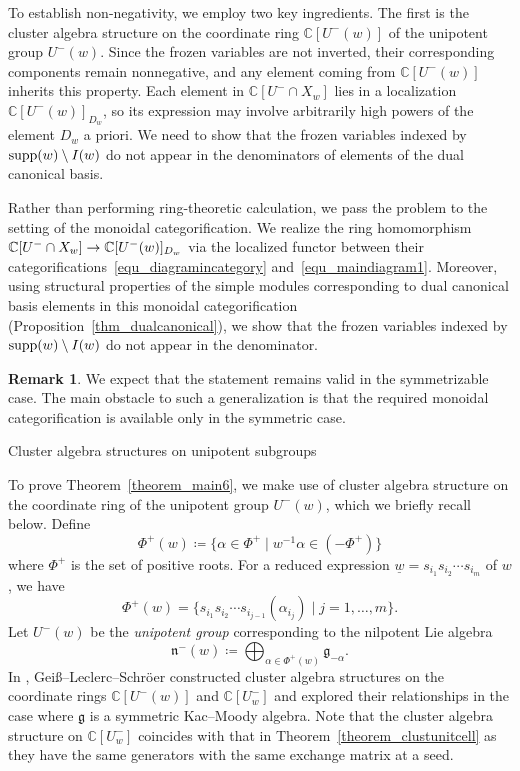 \documentclass[11pt]{amsart}
\makeatletter
\def\subsection{\@startsection{subsection}{2}%
  \z@{-.8\linespacing\@plus-.3\linespacing}{.3\linespacing\@plus.2\linespacing}%
  {\normalfont\bfseries}}
\newcommand{\C}{\mathbb{C}}
\def\frak{\mathfrak}
\numberwithin{equation}{section}
\theoremstyle{plain}
\theoremstyle{definition}
\newtheorem{remark}[theorem]{Remark}
\def\to{\mathchoice{\longrightarrow}{\rightarrow}{\rightarrow}{\rightarrow}}
\numberwithin{equation}{section}
\makeatother
\begin{document}
To establish non-negativity, we employ two key ingredients. The first is the cluster algebra structure on the coordinate ring $\C[U^-(w)]$ of the unipotent group $U^-(w)$. Since the frozen variables are not inverted, their corresponding components remain nonnegative, and any element coming from $\C[U^-(w)]$ inherits this property. Each element in $\C[U^-\cap X_w]$ lies in a localization $\C[U^-(w)]_{D_w}$, so its expression may involve arbitrarily high powers of the element $D_w$ a priori. We need to show that the frozen variables indexed by ${\rm supp}(w) \setminus I(w)$ do not appear in the denominators of elements of the dual canonical basis.

Rather than performing ring-theoretic calculation, we pass the problem to the setting of the monoidal categorification. We realize the ring homomorphism $\C[U^- \cap X_w] \to \C[U^-(w)]_{D_w}$ via the localized functor between their categorifications~\eqref{equ_diagramincategory} and~\eqref{equ_maindiagram1}. Moreover, using structural properties of the simple modules corresponding to dual canonical basis elements in this monoidal categorification (Proposition~\ref{thm_dualcanonical}), we show that the frozen variables indexed by ${\rm supp}(w) \setminus I(w)$ do not appear in the denominator. 


\begin{remark}
We expect that the statement remains valid in the symmetrizable case. The main obstacle to such a generalization is that the required monoidal categorification is available only in the symmetric case.
\end{remark}



\subsection{Cluster algebra structures on unipotent subgroups}

To prove Theorem~\ref{theorem_main6}, we make use of cluster algebra structure on the coordinate ring of the unipotent group $U^-(w)$, which we briefly recall below. Define 
$$
\Phi^+(w) \coloneqq \bigl\{ \alpha \in \Phi^+ \mid w^{-1} \alpha \in (- \Phi^+) \bigr\}
$$ 
where $\Phi^+$ is the set of positive roots. For a reduced expression $\underline{w} =  s_{i_1} s_{i_2} \cdots s_{i_m}$ of $w$, we have
$$
\Phi^+(w) = \{  s_{i_1} s_{i_2}\cdots s_{i_{j-1}}(\alpha_{i_j}) \mid j = 1, \dots, m\}.
$$
Let $U^-(w)$ be the \emph{unipotent group} corresponding to the nilpotent Lie algebra
$$
\frak{n}^-(w) \coloneqq \bigoplus_{\alpha \in \Phi^+(w)} \frak{g}_{-\alpha}.
$$
In \cite{GLS11}, Gei{\ss}--Leclerc--Schr{\"{o}}er constructed cluster algebra structures on the coordinate rings $\C[U^-(w)]$ and $\C[U^-_w]$ and explored their relationships in the case where $\frak{g}$ is a symmetric Kac--Moody algebra. Note that the cluster algebra structure on $\C[U^-_w]$ coincides with that in Theorem~\ref{theorem_clustunitcell} as they have the same generators with the same exchange matrix at a seed.
\end{document}
